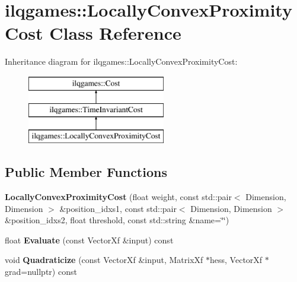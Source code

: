 \hypertarget{classilqgames_1_1_locally_convex_proximity_cost}{}\section{ilqgames\+:\+:Locally\+Convex\+Proximity\+Cost Class Reference}
\label{classilqgames_1_1_locally_convex_proximity_cost}
Inheritance diagram for ilqgames\+:\+:Locally\+Convex\+Proximity\+Cost\+:\begin{figure}[H]
\begin{center}
\leavevmode
\includegraphics[height=3.000000cm]{classilqgames_1_1_locally_convex_proximity_cost}
\end{center}
\end{figure}
\subsection*{Public Member Functions}
\begin{DoxyCompactItemize}
\item 
{\bfseries Locally\+Convex\+Proximity\+Cost} (float weight, const std\+::pair$<$ Dimension, Dimension $>$ \&position\+\_\+idxs1, const std\+::pair$<$ Dimension, Dimension $>$ \&position\+\_\+idxs2, float threshold, const std\+::string \&name=\char`\"{}\char`\"{})\hypertarget{classilqgames_1_1_locally_convex_proximity_cost_aabea3cea381b56639bcb4e60df93ee48}{}\label{classilqgames_1_1_locally_convex_proximity_cost_aabea3cea381b56639bcb4e60df93ee48}

\item 
float {\bfseries Evaluate} (const Vector\+Xf \&input) const \hypertarget{classilqgames_1_1_locally_convex_proximity_cost_ae0f309dfa69dc2c46158afda394af9e3}{}\label{classilqgames_1_1_locally_convex_proximity_cost_ae0f309dfa69dc2c46158afda394af9e3}

\item 
void {\bfseries Quadraticize} (const Vector\+Xf \&input, Matrix\+Xf $\ast$hess, Vector\+Xf $\ast$grad=nullptr) const \hypertarget{classilqgames_1_1_locally_convex_proximity_cost_a246cd61ea63b1f9665b970d17dbebb30}{}\label{classilqgames_1_1_locally_convex_proximity_cost_a246cd61ea63b1f9665b970d17dbebb30}

\end{DoxyCompactItemize}
